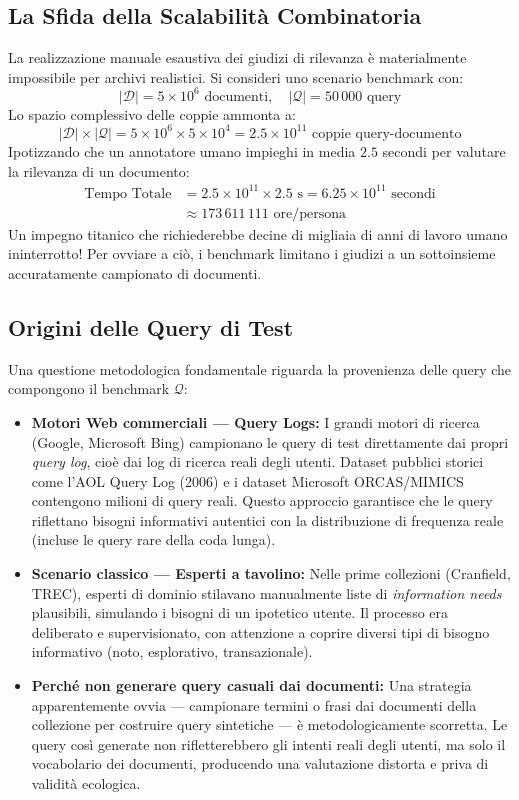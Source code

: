 \subsection{La Sfida della Scalabilità Combinatoria}
La realizzazione manuale esaustiva dei giudizi di rilevanza è materialmente impossibile per archivi realistici.
Si consideri uno scenario benchmark con:
\[
|\mathcal{D}| = 5 \times 10^6 \text{ documenti}, \quad |\mathcal{Q}| = 50\,000 \text{ query}
\]
Lo spazio complessivo delle coppie ammonta a:
\[
|\mathcal{D}| \times |\mathcal{Q}| = 5 \times 10^6 \times 5 \times 10^4 = 2.5 \times 10^{11} \text{ coppie query-documento}
\]
Ipotizzando che un annotatore umano impieghi in media $2.5$ secondi per valutare la rilevanza di un documento:
\begin{align*}
\text{Tempo Totale} &= 2.5 \times 10^{11} \times 2.5\text{ s} = 6.25 \times 10^{11}\text{ secondi} \\
&\approx 173\,611\,111 \text{ ore/persona}
\end{align*}
Un impegno titanico che richiederebbe decine di migliaia di anni di lavoro umano ininterrotto!
Per ovviare a ciò, i benchmark limitano i giudizi a un sottoinsieme accuratamente campionato di documenti.

\subsection{Origini delle Query di Test}
\label{subsec:origini-query}

Una questione metodologica fondamentale riguarda la provenienza delle query che compongono il benchmark $\mathcal{Q}$:

\begin{itemize}
    \item \textbf{Motori Web commerciali — Query Logs:} I grandi motori di ricerca (Google, Microsoft Bing) campionano le query di test direttamente dai propri \textit{query log}, cioè dai log di ricerca reali degli utenti. Dataset pubblici storici come l'AOL Query Log (2006) e i dataset Microsoft ORCAS/MIMICS contengono milioni di query reali. Questo approccio garantisce che le query riflettano bisogni informativi autentici con la distribuzione di frequenza reale (incluse le query rare della coda lunga).
    \item \textbf{Scenario classico — Esperti a tavolino:} Nelle prime collezioni (Cranfield, TREC), esperti di dominio stilavano manualmente liste di \textit{information needs} plausibili, simulando i bisogni di un ipotetico utente. Il processo era deliberato e supervisionato, con attenzione a coprire diversi tipi di bisogno informativo (noto, esplorativo, transazionale).
    \item \textbf{Perché non generare query casuali dai documenti:} Una strategia apparentemente ovvia — campionare termini o frasi dai documenti della collezione per costruire query sintetiche — è metodologicamente scorretta. Le query così generate non rifletterebbero gli intenti reali degli utenti, ma solo il vocabolario dei documenti, producendo una valutazione distorta e priva di validità ecologica.
\end{itemize}

